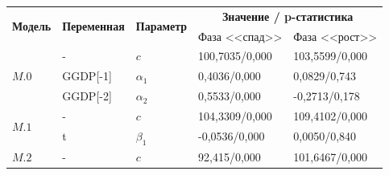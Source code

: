 \documentclass[a4paper,14pt]{extreport}
\begin{document}
\begin{table}[H]
	\begin{tabular}{l|ll|ll}
		\hline
		\multicolumn{1}{c|}{\multirow{2}{*}{\textbf{Модель}}} & \multicolumn{1}{c}{\multirow{2}{*}{\textbf{Переменная}}} & \multicolumn{1}{c|}{\multirow{2}{*}{\textbf{Параметр}}} & \multicolumn{2}{c}{\textbf{Значение / p-статистика}}                                     \\
		\multicolumn{1}{c|}{}                                 & \multicolumn{1}{c}{}                                     & \multicolumn{1}{c|}{}                                   & \multicolumn{1}{c}{Фаза <<спад>>}                    & \multicolumn{1}{c}{Фаза <<рост>>} \\ \hline
		\multirow{3}{*}{$M.0$}                                & -                                                        & $c$                                                     & 100,7035/0,000                                       & 103,5599/0,000                    \\
		                                                      & GGDP[-1]                                                 & $\alpha_1$                                              & 0,4036/0,000                                         & 0,0829/0,743                      \\
		                                                      & GGDP[-2]                                                 & $\alpha_2$                                              & 0,5533/0,000                                         & -0,2713/0,178                     \\ \hline
		\multirow{2}{*}{$M.1$}                                & -                                                        & $c$                                                     & 104,3309/0,000                                       & 109,4102/0,000                    \\
		                                                      & t                                                        & $\beta_1$                                               & -0,0536/0,000                                        & 0,0050/0,840                      \\ \hline
		\multirow{3}{*}{$M.2$}                                & -                                                        & $c$                                                     & 92,415/0,000                                         & 101,6467/0,000                    \\

\end{tabular}
\end{table}
\end{document}
